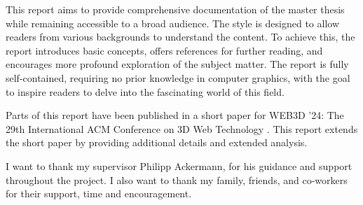 
This report aims to provide comprehensive documentation of the master thesis while remaining accessible to a broad audience. The style is designed to allow readers from various backgrounds to understand the content. To achieve this, the report introduces basic concepts, offers references for further reading, and encourages more profound exploration of the subject matter. The report is fully self-contained, requiring no prior knowledge in computer graphics, with the goal to inspire readers to delve into the fascinating world of this field.

Parts of this report have been published in a short paper for WEB3D '24: The 29th International ACM Conference on 3D Web Technology \cite{ownShortPaper}. This report extends the short paper by providing additional details and extended analysis.

I want to thank my supervisor Philipp Ackermann, for his guidance and support throughout the project. I also want to thank my family, friends, and co-workers for their support, time and encouragement.
